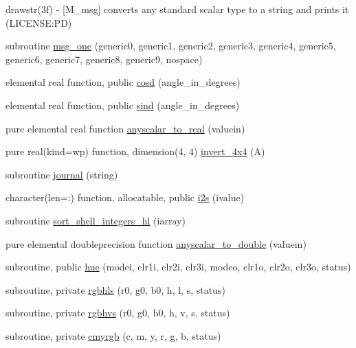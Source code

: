 \begin{DoxyCompactItemize}
\begin{DoxyCompactList}
drawstr(3f) -\/ \mbox{[}M\+\_\+msg\mbox{]} converts any standard scalar type to a string and prints it (L\+I\+C\+E\+N\+SE\+:PD) \end{DoxyCompactList}\item 
subroutine \mbox{\hyperlink{namespacem__pixel_a8c097c521deafffc765bd3f35eca423c}{msg\+\_\+one}} (generic0, generic1, generic2, generic3, generic4, generic5, generic6, generic7, generic8, generic9, nospace)
\item 
elemental real function, public \mbox{\hyperlink{namespacem__pixel_a312c40bfbd03b2bbe6f85bc5efca6ce3}{cosd}} (angle\+\_\+in\+\_\+degrees)
\item 
elemental real function, public \mbox{\hyperlink{namespacem__pixel_a3ef23ce0230c47b30cb627ebd439daae}{sind}} (angle\+\_\+in\+\_\+degrees)
\item 
pure elemental real function \mbox{\hyperlink{namespacem__pixel_a79feab3c00d124d3f3396ad87ed4940e}{anyscalar\+\_\+to\+\_\+real}} (valuein)
\item 
pure real(kind=wp) function, dimension(4, 4) \mbox{\hyperlink{namespacem__pixel_a630b892544962a88d91b1ab983dc5649}{invert\+\_\+4x4}} (A)
\item 
subroutine \mbox{\hyperlink{namespacem__pixel_ac39c9efa849915aff58657e2df03fe3c}{journal}} (string)
\item 
character(len=\+:) function, allocatable, public \mbox{\hyperlink{namespacem__pixel_a4d23e0d3f4de5b3652a4eb5a61d7dc8d}{i2s}} (ivalue)
\item 
subroutine \mbox{\hyperlink{namespacem__pixel_a4396c3ff36a080fbbfa859348203d0c7}{sort\+\_\+shell\+\_\+integers\+\_\+hl}} (iarray)
\item 
pure elemental doubleprecision function \mbox{\hyperlink{namespacem__pixel_a18d90bca3489d1280c4326e51b5cb7b3}{anyscalar\+\_\+to\+\_\+double}} (valuein)
\item 
subroutine, public \mbox{\hyperlink{namespacem__pixel_aa76d2ac385f3ad0bc2b555cc14b7d53f}{hue}} (modei, clr1i, clr2i, clr3i, modeo, clr1o, clr2o, clr3o, status)
\item 
subroutine, private \mbox{\hyperlink{namespacem__pixel_a02bb73b68aeae5056ccf76868146b1b4}{rgbhls}} (r0, g0, b0, h, l, s, status)
\item 
subroutine, private \mbox{\hyperlink{namespacem__pixel_a07ffb197bdcd075f5375e95b43c18915}{rgbhvs}} (r0, g0, b0, h, v, s, status)
\item 
subroutine, private \mbox{\hyperlink{namespacem__pixel_a98c49513d301803bb2c5cd28b8ccdba3}{cmyrgb}} (c, m, y, r, g, b, status)

\end{DoxyCompactItemize}
